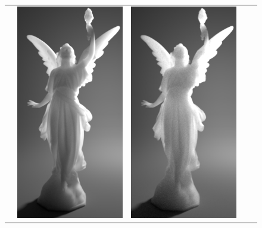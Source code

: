 \begin{figure}
\begin{tabular}{ccccc}
		\raisebox{\raiseLen}{\rotatebox[origin=c]{90}{$\radius_i=400\text{nm}$}} &
		\includegraphics[height=\resLen]{images/lucy/N1_400nm.jpg} &
		\includegraphics[height=\resLen]{images/lucy/N50_400nm.jpg} &

\end{tabular}
\end{figure}
